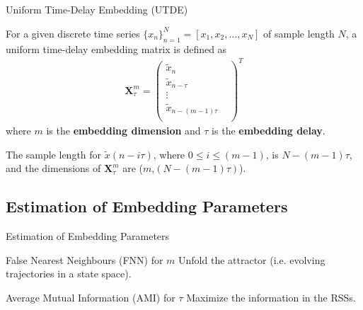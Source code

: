 \subsection{}
{

\begin{frame}{Uniform Time-Delay Embedding (UTDE)}

For a given discrete time series $\{x_n\}_{n=1}^{N} = [x_1 , x_2, \dots, x_N]$
of sample length $N$, a uniform time-delay embedding matrix is defined as 
\begin{eqnarray*}
 \mathbf{X}^{m}_{\tau}
  = \begin{pmatrix} \nonumber
      \tilde{x}_n  & \\
      \tilde{x}_{n-\tau}  & \\
      \vdots  &  \\
      \tilde{x}_{n-(m-1)\tau} & \\
      \end{pmatrix}^T
\end{eqnarray*}
where $m$ is the \textbf{embedding dimension}  and  $\tau$ is the \textbf{ embedding delay}.


The sample length for $\tilde{x}(n-i\tau)$, where $0 \leq i \leq (m-1)$, is $N-(m-1)\tau$,
and the dimensions of $\mathbf{X}^{m}_{\tau}$ are ($m$,$(N-(m-1)\tau)$).

\end{frame}
}


\subsection{Estimation of Embedding Parameters}
{

\begin{frame}{Estimation of Embedding Parameters }

\begin{block}{False Nearest Neighbours (FNN) for $m$}
Unfold the attractor (i.e. evolving trajectories
in a state space).
\end{block}

\begin{block}{Average Mutual Information (AMI) for $\tau$}
Maximize the information in the RSSs.
\end{block}
	
\end{frame}
}




